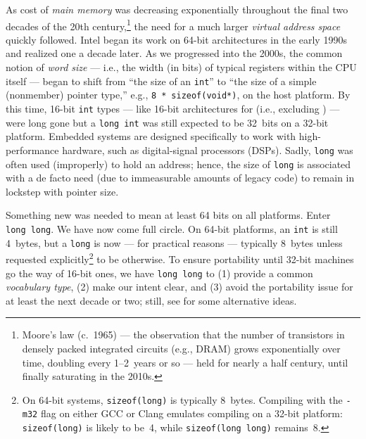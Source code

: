 \noindent As cost of \emph{main memory} was decreasing exponentially
throughout the final two decades of the 20th
century,{\cprotect\footnote{Moore's law (c.~1965) --- the observation
that the number of transistors in densely packed integrated circuits
(e.g., DRAM) grows exponentially over time, doubling every 1--2~years
or so --- held for nearly a half century, until finally saturating in
  the 2010s.}} the need for a much larger \emph{virtual address space}
quickly followed. Intel began its work on 64-bit architectures in the
early 1990s and realized one a decade later. As we progressed into
the 2000s, the common notion of \emph{word size} --- i.e., the width (in
bits) of typical registers within the CPU itself --- began to shift from
``the size of an \lstinline!int!'' to ``the size of a simple (nonmember)
pointer type,'' e.g., \lstinline!8!~\lstinline!*!~\lstinline!sizeof(void*)!, on the host platform. By this time, 16-bit \lstinline!int! types --- like 16-bit architectures for  (i.e., excluding ) --- were long gone but a \lstinline!long!~\lstinline!int! was still expected to be 32~bits on a 32-bit platform. Embedded systems are designed specifically to work with high-performance hardware, such as digital-signal processors (DSPs). Sadly,
\lstinline!long! was often used (improperly) to hold an address; hence,
the size of \lstinline!long! is associated with a de facto need (due to immeasurable amounts of legacy code) to remain in lockstep with pointer size.

Something new was needed to mean at least 64 bits on all platforms.
Enter \lstinline!long!~\lstinline!long!. We have now come full circle. On
64-bit platforms, an \lstinline!int! is still 4~bytes, but a \lstinline!long!
is now --- for practical reasons --- typically 8~bytes unless requested
explicitly{\cprotect\footnote{On 64-bit systems, \lstinline!sizeof(long)!
is typically 8~bytes. Compiling with the \lstinline!-m32! flag on either
GCC or Clang emulates compiling on a 32-bit platform:
\lstinline!sizeof(long)! is likely to be~4, while
  \lstinline!sizeof(long!~\lstinline!long)! remains~8.}} to be otherwise. To ensure portability until 32-bit machines go the way of 16-bit ones,
we have \lstinline!long!~\lstinline!long! to (1) provide a common \emph{vocabulary type}, (2)
make our intent clear, and (3) avoid the portability issue for
at least the next decade or two; still, see 
for some alternative ideas.



